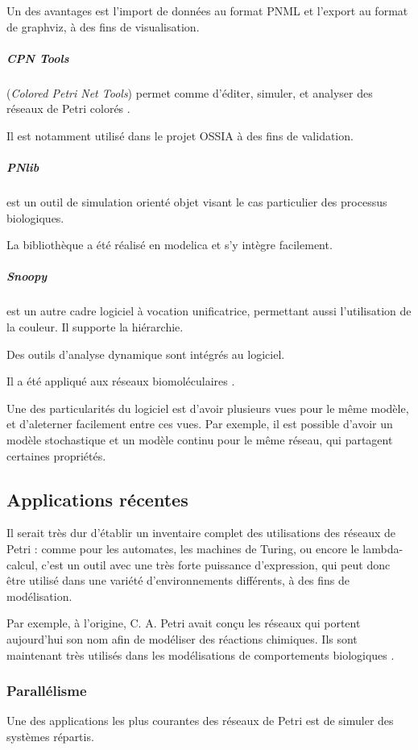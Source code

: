 Un des avantages est l'import de données au format \ac{PNML} et l'export au format  de \gls{graphviz}, à des fins de visualisation.

\subparagraph{CPN Tools} (\textit{Colored Petri Net Tools}) permet comme  d'éditer, simuler, et analyser des réseaux de Petri colorés \cite{jensen2007coloured}.

Il est notamment utilisé dans le projet \ac{OSSIA} à des fins de validation.

\subparagraph{PNlib} \cite{pross2014object} est un outil de simulation orienté objet visant le cas particulier des processus biologiques.

La bibliothèque a été réalisé en \gls{modelica} et s'y intègre facilement.

\subparagraph{Snoopy} \cite{heiner2012snoopy} est un autre cadre logiciel à vocation unificatrice, permettant aussi l'utilisation de la couleur. Il supporte la hiérarchie.

Des outils d'analyse dynamique sont intégrés au logiciel.

Il a été appliqué aux réseaux biomoléculaires \cite{rohr2010snoopy}.

Une des particularités du logiciel est d'avoir plusieurs vues pour le même modèle, et d'aleterner facilement entre ces vues. Par exemple, il est possible d'avoir un modèle stochastique et un modèle continu pour le même réseau, qui partagent certaines propriétés.

\subsection{Applications récentes}
Il serait très dur d'établir un inventaire complet des utilisations des réseaux de Petri : comme pour les automates, les machines de Turing, ou encore le lambda-calcul, c'est un outil avec une très forte puissance d'expression, qui peut donc être utilisé dans une variété d'environnements différents, à des fins de modélisation.

Par exemple, à l'origine, C. A. Petri avait conçu les réseaux qui portent aujourd'hui son nom afin de modéliser des réactions chimiques. Ils sont maintenant très utilisés dans les modélisations de comportements biologiques \cite{koch2014petri}.

\subsubsection{Parallélisme}
Une des applications les plus courantes des réseaux de Petri est de simuler des systèmes répartis.

